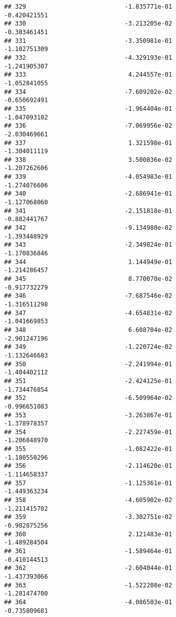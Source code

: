 \documentclass[
]{article}
\begin{document}
\begin{verbatim}
## 329                           -1.835771e-01               -0.420421551
## 330                           -3.213205e-02               -0.383461451
## 331                           -3.350981e-01               -1.102751309
## 332                           -4.329193e-01               -1.241905307
## 333                            4.244557e-01               -1.052841055
## 334                           -7.609202e-02               -0.650692491
## 335                           -1.964404e-01               -1.047093102
## 336                           -7.069956e-02               -2.030469661
## 337                            1.321598e-01               -1.304011119
## 338                            3.500836e-02               -1.207262606
## 339                           -4.054983e-01               -1.274076606
## 340                           -2.686941e-01               -1.127068060
## 341                           -2.151818e-01               -0.882441767
## 342                           -9.134980e-02               -1.393448929
## 343                           -2.349824e-01               -1.170836846
## 344                            1.144949e-01               -1.214286457
## 345                            8.770070e-02               -0.917732279
## 346                           -7.687546e-02               -1.316511298
## 347                           -4.654831e-02               -1.041669853
## 348                            6.608704e-02               -2.901247196
## 349                           -1.220724e-02               -1.132646683
## 350                           -2.241994e-01               -1.404402112
## 351                           -2.424125e-01               -1.734476854
## 352                           -6.509964e-02               -0.996651083
## 353                           -3.263867e-01               -1.378978357
## 354                           -2.227459e-01               -1.206848970
## 355                           -1.082422e-01               -1.180550296
## 356                           -2.114620e-01               -1.114658337
## 357                           -1.125361e-01               -1.449363234
## 358                           -4.605902e-02               -1.211415702
## 359                           -3.302751e-02               -0.982875256
## 360                            2.121483e-01               -1.489284504
## 361                           -1.589464e-01               -0.410144513
## 362                           -2.604044e-01               -1.437393066
## 363                           -1.522208e-02               -1.281474700
## 364                           -4.086503e-01               -0.735809681

\end{verbatim}
\end{document}
